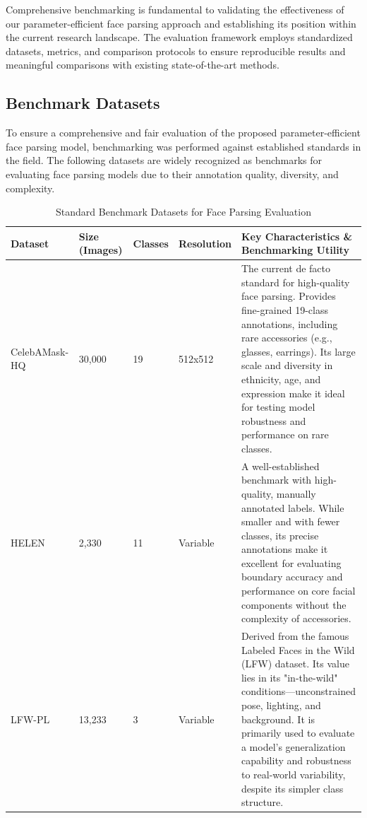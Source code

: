 \documentclass[12pt,a4paper]{report}
\begin{document}
Comprehensive benchmarking is fundamental to validating the effectiveness of our parameter-efficient face parsing approach and establishing its position within the current research landscape. The evaluation framework employs standardized datasets, metrics, and comparison protocols to ensure reproducible results and meaningful comparisons with existing state-of-the-art methods.


\begin{landscape}
\subsection{Benchmark Datasets}

To ensure a comprehensive and fair evaluation of the proposed parameter-efficient face parsing model, benchmarking was performed against established standards in the field. The following datasets are widely recognized as benchmarks for evaluating face parsing models due to their annotation quality, diversity, and complexity.
\begin{table}[H]
\centering

\label{tab:benchmark_datasets}
\begin{tabular}{|p{3cm}|p{2cm}|p{2cm}|p{2.5cm}|p{9.5cm}|} %
\hline
\textbf{Dataset} & \textbf{Size (Images)} & \textbf{Classes} & \textbf{Resolution} & \textbf{Key Characteristics \& Benchmarking Utility} \\
\hline
CelebAMask-HQ \cite{lee2020maskgan} & 30,000 & 19 & 512x512 & The current de facto standard for high-quality face parsing. Provides fine-grained 19-class annotations, including rare accessories (e.g., glasses, earrings). Its large scale and diversity in ethnicity, age, and expression make it ideal for testing model robustness and performance on rare classes. \\
\hline
HELEN \cite{le2012interactive} & 2,330 & 11 & Variable & A well-established benchmark with high-quality, manually annotated labels. While smaller and with fewer classes, its precise annotations make it excellent for evaluating boundary accuracy and performance on core facial components without the complexity of accessories. \\
\hline
LFW-PL \cite{kae2013augmenting} & 13,233 & 3 & Variable & Derived from the famous Labeled Faces in the Wild (LFW) dataset. Its value lies in its "in-the-wild" conditions—unconstrained pose, lighting, and background. It is primarily used to evaluate a model's generalization capability and robustness to real-world variability, despite its simpler class structure. \\
\hline
\end{tabular}
\caption{Standard Benchmark Datasets for Face Parsing Evaluation}
\end{table}
\end{landscape}
\newpage
\end{document}
